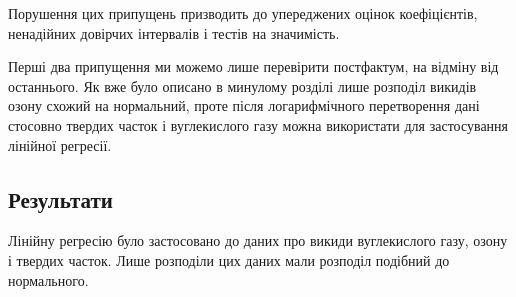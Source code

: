 Порушення цих припущень призводить до упереджених оцінок коефіцієнтів, ненадійних довірчих інтервалів і тестів на значимість.

Перші два припущення ми можемо лише перевірити постфактум, на відміну від останнього.\cite{linear_reg2} 
Як вже було описано в минулому розділі лише розподіл викидів озону схожий на нормальний, проте після логарифмічного перетворення дані стосовно твердих часток і вуглекислого газу можна використати для застосування лінійної регресії.

\subsection{Результати}

Лінійну регресію було застосовано до даних про викиди вуглекислого газу, озону і твердих часток. 
Лише розподіли цих даних мали розподіл подібний до нормального. 


\begin{center}
    \vspace{1cm}

\end{center}

